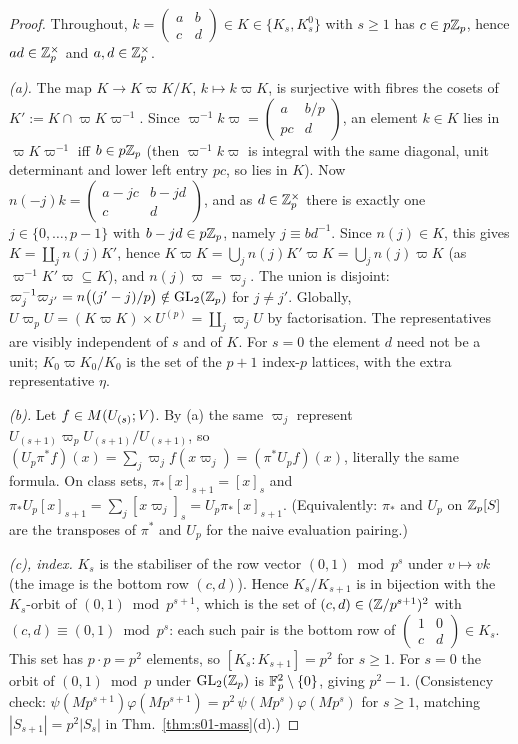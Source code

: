 \begin{proof}
Throughout, $k=\left(\begin{smallmatrix}a&b\\c&d\end{smallmatrix}\right)\in K\in\{K_s,K^0_s\}$ with $s\ge1$ has $c\in p\mathbb{Z}_p$, hence
$ad\in\mathbb{Z}_p^\times$ and $a,d\in\mathbb{Z}_p^\times$.

\emph{(a).} The map $K\to K\varpi K/K$, $k\mapsto k\varpi K$, is surjective with fibres the cosets of
$K':=K\cap\varpi K\varpi^{-1}$. Since $\varpi^{-1}k\varpi=\left(\begin{smallmatrix}a&b/p\\pc&d\end{smallmatrix}\right)$, an element $k\in K$ lies in
$\varpi K\varpi^{-1}$ iff $b\in p\mathbb{Z}_p$ (then $\varpi^{-1}k\varpi$ is integral with the same diagonal, unit determinant and lower left
entry $pc$, so lies in $K$). Now $n(-j)k=\left(\begin{smallmatrix}a-jc&b-jd\\c&d\end{smallmatrix}\right)$, and as $d\in\mathbb{Z}_p^\times$ there is exactly
one $j\in\{0,\dots,p-1\}$ with $b-jd\in p\mathbb{Z}_p$, namely $j\equiv bd^{-1}$. Since $n(j)\in K$, this gives $K=\coprod_jn(j)K'$, hence
$K\varpi K=\bigcup_jn(j)K'\varpi K=\bigcup_jn(j)\varpi K$ (as $\varpi^{-1}K'\varpi\subseteq K$), and $n(j)\varpi=\varpi_j$. The union is
disjoint: $\varpi_j^{-1}\varpi_{j'}=n\big((j'-j)/p\big)\notin\mathrm{GL}_2(\mathbb{Z}_p)$ for $j\ne j'$. Globally,
$U\varpi_pU=(K\varpi K)\times U^{(p)}=\coprod_j\varpi_jU$ by factorisation. The representatives are visibly independent of $s$
and of $K$. For $s=0$ the element $d$ need not be a unit; $K_0\varpi K_0/K_0$ is the set of the $p+1$ index-$p$ lattices, with the
extra representative $\eta$.

\emph{(b).} Let $f\in M(U_{(s)};V)$. By (a) the same $\varpi_j$ represent $U_{(s+1)}\varpi_pU_{(s+1)}/U_{(s+1)}$, so
$(U_p\pi^*f)(x)=\sum_j\varpi_jf(x\varpi_j)=(\pi^*U_pf)(x)$, literally the same formula. On class sets,
$\pi_*[x]_{s+1}=[x]_s$ and $\pi_*U_p[x]_{s+1}=\sum_j[x\varpi_j]_s=U_p\pi_*[x]_{s+1}$. (Equivalently: $\pi_*$ and $U_p$ on $\mathbb{Z}_p[S]$ are the
transposes of $\pi^*$ and $U_p$ for the naive evaluation pairing.)

\emph{(c), index.} $K_s$ is the stabiliser of the row vector $(0,1)\bmod p^s$ under $v\mapsto vk$ (the image is the bottom row
$(c,d)$). Hence $K_s/K_{s+1}$ is in bijection with the $K_s$-orbit of $(0,1)\bmod p^{s+1}$, which is the set of
$(c,d)\in(\mathbb{Z}/p^{s+1})^2$ with $(c,d)\equiv(0,1)\bmod p^s$: each such pair is the bottom row of
$\left(\begin{smallmatrix}1&0\\c&d\end{smallmatrix}\right)\in K_s$. This set has $p\cdot p=p^2$ elements, so $[K_s:K_{s+1}]=p^2$ for $s\ge1$. For
$s=0$ the orbit of $(0,1)\bmod p$ under $\mathrm{GL}_2(\mathbb{Z}_p)$ is $\mathbb{F}_p^2\setminus\{0\}$, giving $p^2-1$. (Consistency check:
$\psi(Mp^{s+1})\varphi(Mp^{s+1})=p^2\,\psi(Mp^s)\varphi(Mp^s)$ for $s\ge1$, matching $|S_{s+1}|=p^2|S_s|$ in
Thm.~\ref{thm:s01-mass}(d).)


\end{proof}
